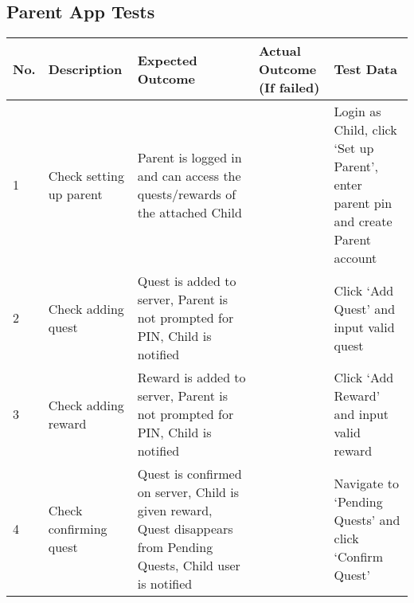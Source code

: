 \begin{landscape}
\section{Parent App Tests}
\begin{tabularx}{\linewidth}{p{1cm} X X X X}
\textbf{No.} & \textbf{Description}                    & \textbf{Expected Outcome}                                  	& \textbf{Actual Outcome (If failed)} & \textbf{Test Data}                                          \\ \hline
1            & Check setting up parent & Parent is logged in and can access the quests/rewards of the attached Child                             &                                     & Login as Child, click `Set up Parent', enter parent pin and create Parent account \\ \hline
2            & Check adding quest      & Quest is added to server, Parent is not prompted for PIN, Child is notified                                  &                                     & Click `Add Quest' and input valid quest                                          \\ \hline
3            & Check adding reward     & Reward is added to server, Parent is not prompted for PIN, Child  is notified                                 &                                     & Click `Add Reward' and input valid reward                                        \\ \hline
4            & Check confirming quest  & Quest is confirmed on server, Child is given reward, Quest disappears from Pending Quests, Child user is notified &                                     & Navigate to `Pending Quests' and click `Confirm Quest'                           \\ \hline
\end{tabularx} 

\end{landscape}